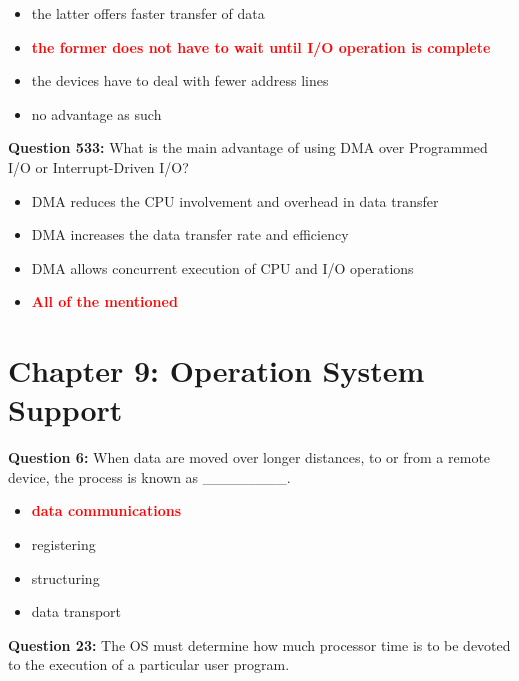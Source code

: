 \documentclass[12pt,a4paper]{article}
\begin{document}
\begin{itemize}
    \item[\textbf{A.}] the latter offers faster transfer of data
    \item[\textbf{B.}] \textcolor{red}{\textbf{the former does not have to wait until I/O operation is complete}}
    \item[\textbf{C.}] the devices have to deal with fewer address lines
    \item[\textbf{D.}] no advantage as such
\end{itemize}

\vspace{0.5cm}

\textbf{Question 533:} What is the main advantage of using DMA over Programmed I/O or Interrupt-Driven I/O?

\begin{itemize}
    \item[\textbf{A.}] DMA reduces the CPU involvement and overhead in data transfer
    \item[\textbf{B.}] DMA increases the data transfer rate and efficiency
    \item[\textbf{C.}] DMA allows concurrent execution of CPU and I/O operations
    \item[\textbf{D.}] \textcolor{red}{\textbf{All of the mentioned}}
\end{itemize}

\vspace{0.5cm}

\section{Chapter 9: Operation System Support}

\textbf{Question 6:} When data are moved over longer distances, to or from a remote device, the process is known as ________.

\begin{itemize}
    \item[\textbf{A.}] \textcolor{red}{\textbf{data communications}}
    \item[\textbf{B.}] registering
    \item[\textbf{C.}] structuring
    \item[\textbf{D.}] data transport
\end{itemize}

\vspace{0.5cm}

\textbf{Question 23:} The OS must determine how much processor time is to be devoted to the execution of a particular user program.
\end{document}
